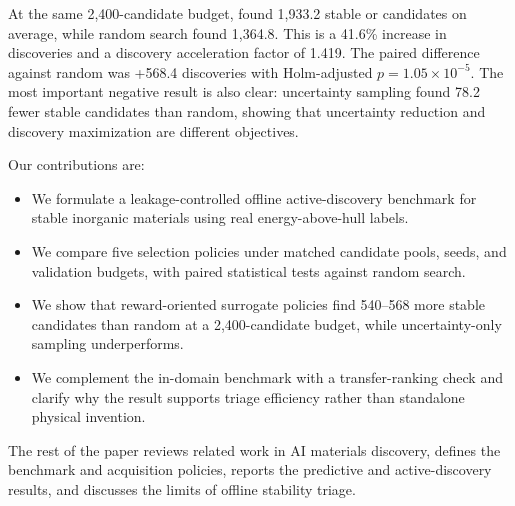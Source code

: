 At the same 2,400-candidate budget, \diverseucb found 1,933.2 stable or \nearhull candidates on average, while random search found 1,364.8. This is a 41.6\% increase in discoveries and a discovery acceleration factor of 1.419. The paired difference against random was +568.4 discoveries with Holm-adjusted $p=1.05 \times 10^{-5}$. The most important negative result is also clear: uncertainty sampling found 78.2 fewer stable candidates than random, showing that uncertainty reduction and discovery maximization are different objectives.

Our contributions are:
\begin{itemize}[leftmargin=*,itemsep=0pt,topsep=0pt]
    \item We formulate a leakage-controlled offline active-discovery benchmark for stable inorganic materials using real \mpdata energy-above-hull labels.
    \item We compare five selection policies under matched candidate pools, seeds, and validation budgets, with paired statistical tests against random search.
    \item We show that reward-oriented surrogate policies find 540--568 more stable candidates than random at a 2,400-candidate budget, while uncertainty-only sampling underperforms.
    \item We complement the in-domain benchmark with a \gnome transfer-ranking check and clarify why the result supports triage efficiency rather than standalone physical invention.
\end{itemize}

The rest of the paper reviews related work in AI materials discovery, defines the benchmark and acquisition policies, reports the predictive and active-discovery results, and discusses the limits of offline stability triage.
